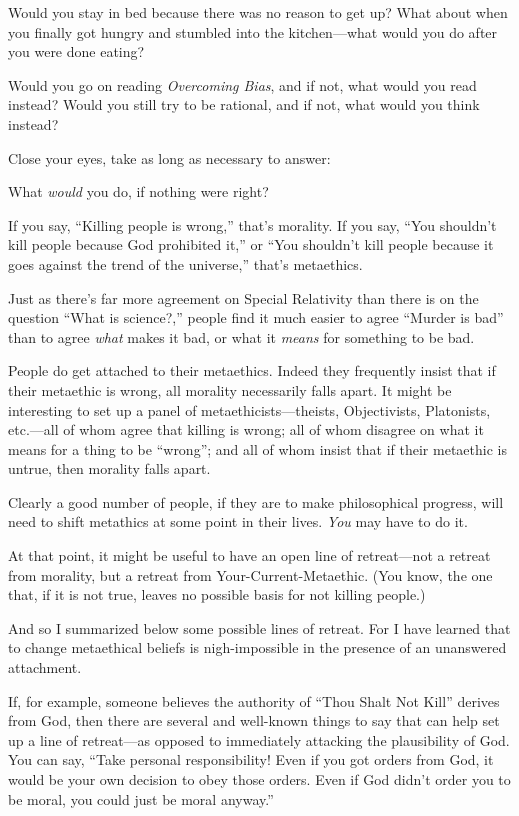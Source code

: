 {
 Would you stay in bed because there was no reason to get up? What
about when you finally got hungry and stumbled into the kitchen---what
would you do after you were done eating?}

{
 Would you go on reading \textit{Overcoming Bias}, and if not, what
would you read instead? Would you still try to be rational, and if not,
what would you think instead?}

{
 Close your eyes, take as long as necessary to answer:}

{
 What \textit{would} you do, if nothing were right?}

\myendsectiontext


{
 If you say, ``Killing people is
wrong,'' that's morality. If you say,
``You shouldn't kill people because
God prohibited it,'' or ``You
shouldn't kill people because it goes against the trend
of the universe,'' that's
metaethics.}

{
 Just as there's far more agreement on Special
Relativity than there is on the question ``What is
science?,'' people find it much easier to agree
``Murder is bad'' than to agree
\textit{what} makes it bad, or what it \textit{means} for something to
be bad.}

{
 People do get attached to their metaethics. Indeed they frequently
insist that if their metaethic is wrong, all morality necessarily falls
apart. It might be interesting to set up a panel of
metaethicists---theists, Objectivists, Platonists, etc.---all of whom
agree that killing is wrong; all of whom disagree on what it means for
a thing to be ``wrong''; and all of
whom insist that if their metaethic is untrue, then morality falls
apart.}

{
 Clearly a good number of people, if they are to make philosophical
progress, will need to shift metathics at some point in their lives.
\textit{You} may have to do it.}

{
 At that point, it might be useful to have an open line of
retreat---not a retreat from morality, but a retreat from
Your-Current-Metaethic. (You know, the one that, if it is not true,
leaves no possible basis for not killing people.)}

{
 And so I summarized below some possible lines of retreat. For I
have learned that to change metaethical beliefs is nigh-impossible in
the presence of an unanswered attachment.}

{
 If, for example, someone believes the authority of
``Thou Shalt Not Kill'' derives from
God, then there are several and well-known things to say that can help
set up a line of retreat---as opposed to immediately attacking the
plausibility of God. You can say, ``Take personal
responsibility! Even if you got orders from God, it would be your own
decision to obey those orders. Even if God didn't order
you to be moral, you could just be moral anyway.''}

